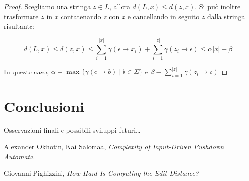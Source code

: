 \documentclass[a4paper,12pt]{report}
\theoremstyle{propositionstyle}
\begin{document}
    \begin{proof}
        Scegliamo una stringa $z \in L$, allora $d(L, x) \leq d(z, x)$.
        Si può inoltre trasformare $z$ in $x$ contatenando $z$ con $x$ e cancellando in seguito $z$ dalla stringa risultante:

        $$ d(L, x) \leq d(z, x) \leq \sum_{i=1}^{\lvert x \rvert} \gamma(\epsilon \rightarrow x_i) + \sum_{i=1}^{\lvert z \rvert} \gamma(z_i \rightarrow \epsilon) \leq \alpha \lvert x \rvert + \beta$$

        In questo caso, $\alpha = \max\{\gamma(\epsilon \rightarrow b) \mid b \in \Sigma\}$ e $\beta = \sum_{i=1}^{\lvert z \rvert} \gamma(z_i \rightarrow \epsilon)$
    \end{proof}

    \section{Conclusioni}

    Osservazioni finali e possibili sviluppi futuri\ldots

    \clearpage
    \begin{thebibliography}{9}

        Alexander Okhotin, Kai Salomaa,
        \textit{Complexity of Input-Driven Pushdown Automata}.

        Giovanni Pighizzini,
        \textit{How Hard Is Computing the Edit Distance?}


    \end{thebibliography}
\end{document}
